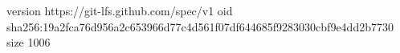 version https://git-lfs.github.com/spec/v1
oid sha256:19a2fca76d956a2c653966d77c4d561f07df644685f9283030cbf9e4dd2b7730
size 1006
